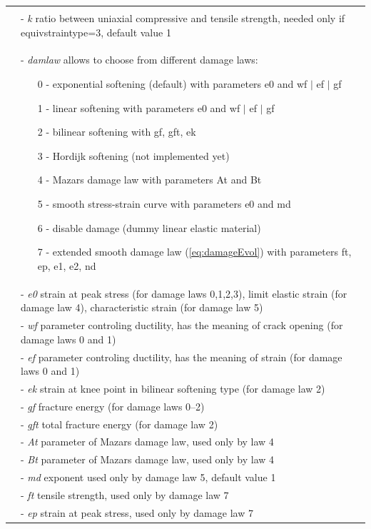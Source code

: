 \documentclass[a4paper]{article}
\newcommand{\param}[1]{{\it #1}}
\begin{document}
\begin{longtable}{|l|p{9cm}|}
\begin{itemize}
\end{itemize}\\
&- \param{k} ratio between uniaxial compressive and tensile strength, needed only if equivstraintype=3, default value 1\\
&- \param{damlaw} allows to choose from different damage laws:
\begin{itemize}\setlength{\itemsep}{-3pt}
\item[0 -] exponential softening (default) with parameters e0 and wf $\vert$ ef $\vert$ gf
\item[1 -] linear softening with parameters e0 and wf $\vert$ ef $\vert$ gf
\item[2 -] bilinear softening with gf, gft, ek
\item[3 -] Hordijk softening (not implemented yet)
\item[4 -] Mazars damage law with parameters At and Bt
\item[5 -] smooth stress-strain curve with parameters e0 and md
\item[6 -] disable damage (dummy linear elastic material)
\item[7 -] extended smooth damage law (\ref{eq:damageEvol}) with parameters ft, ep, e1, e2, nd
\end{itemize}\\
&- \param{e0} strain at peak stress (for damage laws 0,1,2,3), limit elastic strain (for damage law 4), characteristic strain (for damage law 5)\\
&- \param{wf} parameter controling ductility, has the meaning of crack opening (for damage laws 0 and 1)\\
&- \param{ef} parameter controling ductility, has the meaning of strain (for damage laws 0 and 1)\\
&- \param{ek} strain at knee point in bilinear softening type (for damage law 2)\\
&- \param{gf} fracture energy (for damage laws 0--2)\\
&- \param{gft} total fracture energy (for damage law 2)\\
&- \param{At} parameter of Mazars damage law, used only by law 4\\
&- \param{Bt} parameter of Mazars damage law, used only by law 4\\
&- \param{md} exponent used only by damage law 5, default value 1\\
&- \param{ft} tensile strength, used only by damage law 7\\
&- \param{ep} strain at peak stress, used only by damage law 7\\

\end{longtable}
\end{document}
